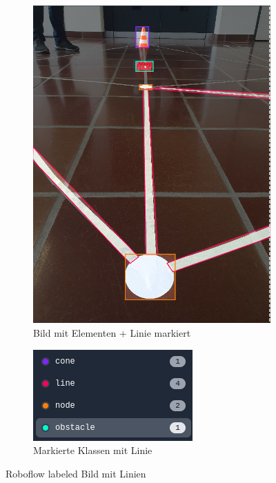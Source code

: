 \begin{figure}[H]
\centering
\begin{subfigure}{0.55\textwidth}
\centering
\includegraphics[width=0.95\linewidth]{assets/informatik-prototyp/yolo/labeled-image-lines.png} 
\caption{Bild mit Elementen + Linie markiert}
\label{fig:labeled-image-lines}
\end{subfigure}
\begin{subfigure}{0.4\textwidth}
\centering
\includegraphics[width=0.95\linewidth]{assets/informatik-prototyp/yolo/labeled-classes-lines.png} 
\caption{Markierte Klassen mit Linie}
\label{fig:line-classes-lines}
\end{subfigure}

\caption{Roboflow labeled Bild mit Linien}
\label{fig:labeling-with-lines}
\end{figure}


